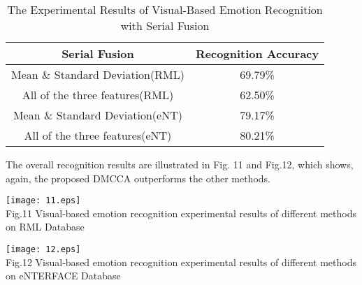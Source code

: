 \documentclass[journal]{IEEEtran}
\begin{document}
\vspace*{-10pt}
\begin{table}[h]
\normalsize
\renewcommand{\arraystretch}{1.0}
\caption{\normalsize{The Experimental Results of Visual-Based Emotion Recognition with Serial Fusion}}
\setlength{\abovecaptionskip}{0pt}
\setlength{\belowcaptionskip}{10pt}
\centering
\tabcolsep 0.07in
\begin{tabular}{cc}
\hline
Serial Fusion & Recognition Accuracy\\
\hline
Mean \& Standard Deviation(RML)  &69.79\%\\
 All of the three features(RML) &62.50\%\\
Mean \& Standard Deviation(eNT)  &79.17\%\\
 All of the three features(eNT) &80.21\%\\
\hline
\end{tabular}
\end{table}

The overall recognition results are illustrated in Fig. 11 and Fig.12, which shows, again, the proposed DMCCA outperforms the other methods.
\begin{figure*}[t]
\centering
\texttt{[image: 11.eps]}\\ Fig.11 Visual-based emotion recognition experimental results of different methods on RML Database\\
\end{figure*}

\begin{figure*}[t]
\centering
\texttt{[image: 12.eps]}\\ Fig.12 Visual-based emotion recognition experimental results of different methods on eNTERFACE Database\\
\end{figure*}


\end{document}
